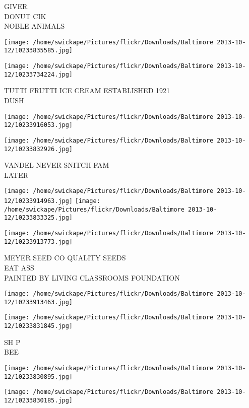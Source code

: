 \documentclass[10pt,letterpaper]{article}
\begin{document}
GIVER\\
DONUT CIK\\
NOBLE ANIMALS
\pagebreak

\texttt{[image: /home/swickape/Pictures/flickr/Downloads/Baltimore 2013-10-12/10233835585.jpg]}

\vspace{0.25in}
\texttt{[image: /home/swickape/Pictures/flickr/Downloads/Baltimore 2013-10-12/10233734224.jpg]}

TUTTI FRUTTI ICE CREAM ESTABLISHED 1921\\
DUSH
\pagebreak

\texttt{[image: /home/swickape/Pictures/flickr/Downloads/Baltimore 2013-10-12/10233916053.jpg]}

\vspace{0.25in}
\texttt{[image: /home/swickape/Pictures/flickr/Downloads/Baltimore 2013-10-12/10233832926.jpg]}

VANDEL NEVER SNITCH FAM\\
LATER
\pagebreak

\texttt{[image: /home/swickape/Pictures/flickr/Downloads/Baltimore 2013-10-12/10233914963.jpg]}
\texttt{[image: /home/swickape/Pictures/flickr/Downloads/Baltimore 2013-10-12/10233833325.jpg]}

\vspace{0.25in}
\texttt{[image: /home/swickape/Pictures/flickr/Downloads/Baltimore 2013-10-12/10233913773.jpg]}

MEYER SEED CO QUALITY SEEDS\\
EAT ASS\\
PAINTED BY LIVING CLASSROOMS FOUNDATION
\pagebreak

\texttt{[image: /home/swickape/Pictures/flickr/Downloads/Baltimore 2013-10-12/10233913463.jpg]}

\vspace{0.25in}
\texttt{[image: /home/swickape/Pictures/flickr/Downloads/Baltimore 2013-10-12/10233831845.jpg]}

SH P\\
BEE
\pagebreak

\texttt{[image: /home/swickape/Pictures/flickr/Downloads/Baltimore 2013-10-12/10233830895.jpg]}

\vspace{0.25in}
\texttt{[image: /home/swickape/Pictures/flickr/Downloads/Baltimore 2013-10-12/10233830185.jpg]}
\end{document}
